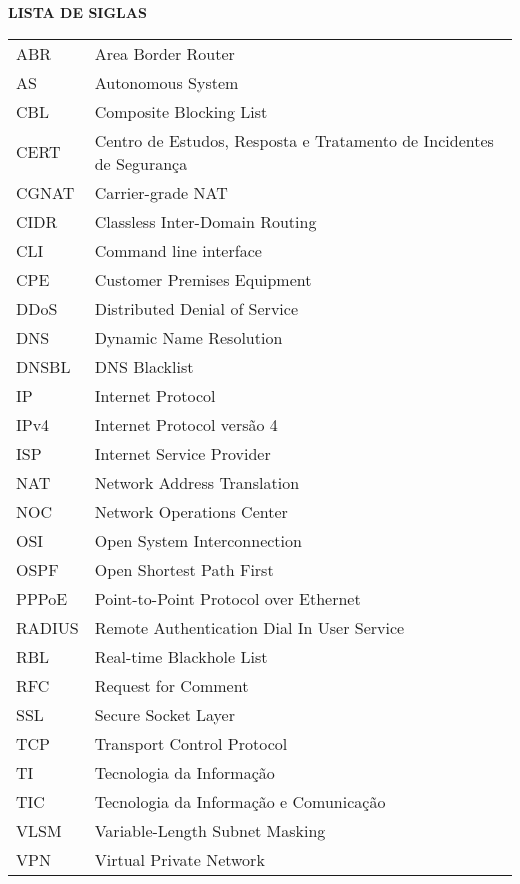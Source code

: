 \begin{center}
  \normalsize{\textbf{LISTA DE SIGLAS}}
\end{center}

\vspace{1mm}

\begin{center}
  \begin{tabular}{ m{3cm} m{10cm} }
    ABR & Area Border Router \\
    AS & Autonomous System \\
    CBL & Composite Blocking List \\
    CERT &  Centro de Estudos, Resposta e Tratamento de Incidentes de Segurança \\
    CGNAT & Carrier-grade NAT \\
    CIDR & Classless Inter-Domain Routing \\
    CLI & Command line interface \\
    CPE & Customer Premises Equipment \\
    DDoS & Distributed Denial of Service \\
    DNS & Dynamic Name Resolution \\
    DNSBL & DNS Blacklist \\
    IP & Internet Protocol \\ 
    IPv4 & Internet Protocol versão 4 \\ 
    ISP & Internet Service Provider \\ 
    NAT & Network Address Translation \\
    NOC & Network Operations Center \\ 
    OSI & Open System Interconnection \\
    OSPF & Open Shortest Path First \\
    PPPoE & Point-to-Point Protocol over Ethernet \\
    RADIUS & Remote Authentication Dial In User Service \\
    RBL & Real-time Blackhole List \\
    RFC & Request for Comment \\
    SSL & Secure Socket Layer \\
    TCP & Transport Control Protocol \\ 
    TI & Tecnologia da Informação \\ 
    TIC & Tecnologia da Informação e Comunicação \\ 
    VLSM & Variable-Length Subnet Masking \\ 
    VPN & Virtual Private Network \\ 
  \end{tabular}
\end{center}
